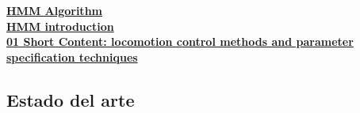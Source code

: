 \documentclass[10pt,onecolumn,twoside,letterpaper]{article}
\begin{document}
\href{run:/home/jackmaster/Downloads/[2013 Joe Wright and Ivan Jordanov] Art Intelligent approches in locomotion - A reveiw.pdf:pdf}{
\textbf{HMM Algorithm}\\
\textbf{HMM introduction}\\
\textbf{01 Short Content: locomotion control methods and parameter specification techniques}\\
}\cite{Wright2014}
\subsection{Estado del arte}
\end{document}
